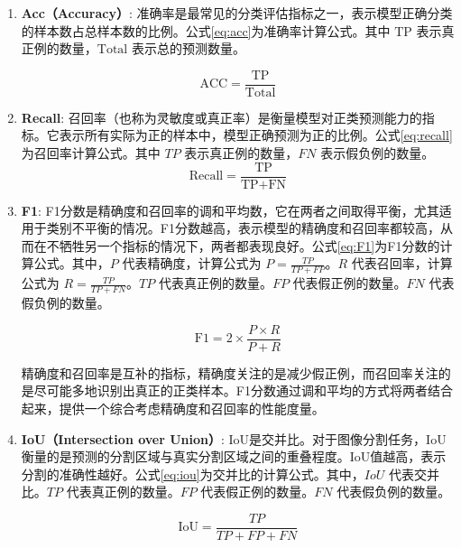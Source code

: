 \begin{enumerate}
  \item \textbf{\textbf{Acc（Accuracy）}}:
  准确率是最常见的分类评估指标之一，表示模型正确分类的样本数占总样本数的比例。公式\eqref{eq:acc}为准确率计算公式。其中 \( \text{TP} \) 表示真正例的数量，\( \text{Total} \) 表示总的预测数量。

  \begin{equation}
    \text{ACC} = \frac{\text{TP}}{\text{Total}}
    \label{eq:acc}
  \end{equation}


\item \textbf{\textbf{Recall}}:
  召回率（也称为灵敏度或真正率）是衡量模型对正类预测能力的指标。它表示所有实际为正的样本中，模型正确预测为正的比例。公式\eqref{eq:recall}为召回率计算公式。其中 \( TP \) 表示真正例的数量，\( FN \) 表示假负例的数量。
    \begin{equation}
      \text{Recall} = \frac{\text{TP}}{\text{TP} + \text{FN}}
      \label{eq:recall}
    \end{equation}

\item \textbf{F1}:
F1分数是精确度和召回率的调和平均数，它在两者之间取得平衡，尤其适用于类别不平衡的情况。F1分数越高，表示模型的精确度和召回率都较高，从而在不牺牲另一个指标的情况下，两者都表现良好。公式\eqref{eq:F1}为F1分数的计算公式。其中，\( P \) 代表精确度，计算公式为 \( P = \frac{TP}{TP + FP} \)。\( R \) 代表召回率，计算公式为 \( R = \frac{TP}{TP + FN} \)。\( TP \) 代表真正例的数量。\( FP \) 代表假正例的数量。\( FN \) 代表假负例的数量。

\begin{equation}
  \text{F1} = 2 \times \frac{P \times R}{P + R}
  \label{eq:F1}
\end{equation}

精确度和召回率是互补的指标，精确度关注的是减少假正例，而召回率关注的是尽可能多地识别出真正的正类样本。F1分数通过调和平均的方式将两者结合起来，提供一个综合考虑精确度和召回率的性能度量。

\item \textbf{IoU（Intersection over Union）}:
  IoU是交并比。对于图像分割任务，IoU衡量的是预测的分割区域与真实分割区域之间的重叠程度。IoU值越高，表示分割的准确性越好。公式\eqref{eq:iou}为交并比的计算公式。其中，\( IoU \) 代表交并比。\( TP \) 代表真正例的数量。\( FP \) 代表假正例的数量。\( FN \) 代表假负例的数量。

\begin{equation}
  \text{IoU} = \frac{TP}{TP + FP + FN}
  \label{eq:iou}
\end{equation}


\end{enumerate}
